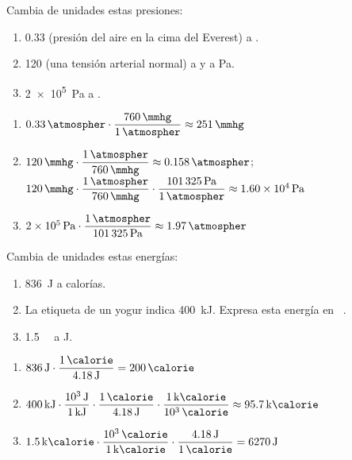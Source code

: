 \begin{exercise}
    Cambia de unidades estas presiones:
    \begin{enumerate}[label=\letraminuscula]
        \item \qty{0.33}{\atmospher} (presión del aire en la cima del Everest) a \unit{\mmhg}.
        \item \qty{120}{\mmhg} (una tensión arterial normal) a \unit{\atmospher} y a \unit{\Pa}.
        \item \qty{2e5}{\Pa} a \unit{\atmospher}.
    \end{enumerate}
    \begin{solu}
        \begin{enumerate}[label=\alph*)]
            \item \(\num{0.33}\,\unit{\atmospher} \cdot \dfrac{\qty{760}{\mmhg}}{\qty{1}{\atmospher}} \approx \qty{251}{\mmhg}\)
            \item \(\num{120}\,\unit{\mmhg} \cdot \dfrac{\qty{1}{\atmospher}}{\qty{760}{\mmhg}} \approx \qty{0.158}{\atmospher}\); \quad
            \(\num{120}\,\unit{\mmhg} \cdot \dfrac{\qty{1}{\atmospher}}{\qty{760}{\mmhg}} \cdot \dfrac{\qty{101325}{\Pa}}{\qty{1}{\atmospher}} \approx \qty{1.60e4}{\Pa}\)
            \item \(\num{2e5}\,\unit{\Pa} \cdot \dfrac{\qty{1}{\atmospher}}{\qty{101325}{\Pa}} \approx \qty{1.97}{\atmospher}\)
        \end{enumerate}
    \end{solu}
\end{exercise}

\begin{exercise}
    Cambia de unidades estas energías:
    \begin{enumerate}[label=\letraminuscula]
        \item \qty{836}{\J} a calorías.
        \item La etiqueta de un yogur indica \qty{400}{\kilo\joule}. Expresa esta energía en \unit{\kilo\calorie}.
        \item \qty{1.5}{\kilo\calorie} a \unit{\J}.
    \end{enumerate}
    \begin{solu}
        \begin{enumerate}[label=\alph*)]
            \item \(\num{836}\,\unit{\J} \cdot \dfrac{\qty{1}{\calorie}}{\qty{4.18}{\J}} = \qty{200}{\calorie}\)
            \item \(\num{400}\,\unit{\kilo\joule} \cdot \dfrac{\qty{e3}{\J}}{\qty{1}{\kilo\joule}} \cdot \dfrac{\qty{1}{\calorie}}{\qty{4.18}{\J}} \cdot \dfrac{\qty{1}{\kilo\calorie}}{\qty{e3}{\calorie}} \approx \qty{95.7}{\kilo\calorie}\)
            \item \(\num{1.5}\,\unit{\kilo\calorie} \cdot \dfrac{\qty{e3}{\calorie}}{\qty{1}{\kilo\calorie}} \cdot \dfrac{\qty{4.18}{\J}}{\qty{1}{\calorie}} = \qty{6270}{\J}\)
        \end{enumerate}
    \end{solu}
\end{exercise}


